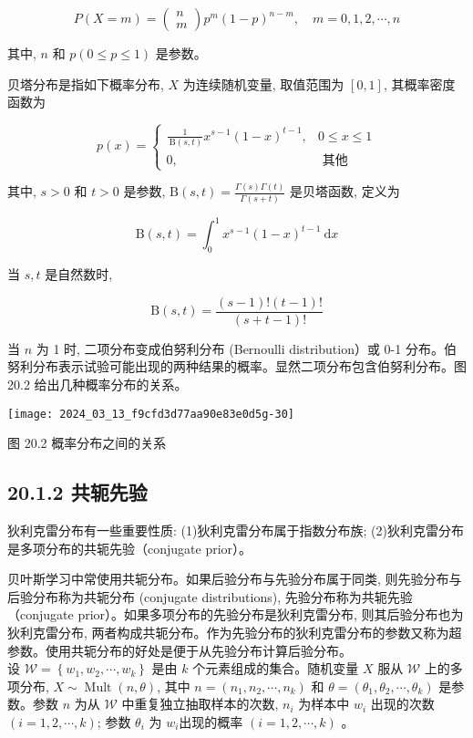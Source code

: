 \documentclass[10pt]{article}
\begin{document}
\begin{CJK*}{UTF8}{bsmi}
\[
P(X=m)=\left(\begin{array}{c}
n  \tag{20.6}\\
m
\end{array}\right) p^{m}(1-p)^{n-m}, \quad m=0,1,2, \cdots, n
\]

其中, $n$ 和 $p(0 \leqslant p \leqslant 1)$ 是参数。

贝塔分布是指如下概率分布, $X$ 为连续随机变量, 取值范围为 $[0,1]$, 其概率密度函数为

\[
p(x)= \begin{cases}\frac{1}{\mathrm{~B}(s, t)} x^{s-1}(1-x)^{t-1}, & 0 \leqslant x \leqslant 1  \tag{20.7}\\ 0, & \text { 其他 }\end{cases}
\]

其中, $s>0$ 和 $t>0$ 是参数, $\mathrm{B}(s, t)=\frac{\Gamma(s) \Gamma(t)}{\Gamma(s+t)}$ 是贝塔函数, 定义为


\begin{equation*}
\mathrm{B}(s, t)=\int_{0}^{1} x^{s-1}(1-x)^{t-1} \mathrm{~d} x \tag{20.8}
\end{equation*}


当 $s, t$ 是自然数时,


\begin{equation*}
\mathrm{B}(s, t)=\frac{(s-1) !(t-1) !}{(s+t-1) !} \tag{20.9}
\end{equation*}


当 $n$ 为 1 时, 二项分布变成伯努利分布 (Bernoulli distribution）或 0-1 分布。伯努利分布表示试验可能出现的两种结果的概率。显然二项分布包含伯努利分布。图 20.2 给出几种概率分布的关系。

\begin{center}
\texttt{[image: 2024\_03\_13\_f9cfd3d77aa90e83e0d5g-30]}
\end{center}

图 20.2 概率分布之间的关系

\subsection*{20.1.2 共轭先验}
狄利克雷分布有一些重要性质: (1)狄利克雷分布属于指数分布族; (2)狄利克雷分布是多项分布的共轭先验（conjugate prior）。

贝叶斯学习中常使用共轭分布。如果后验分布与先验分布属于同类, 则先验分布与后验分布称为共轭分布 (conjugate distributions), 先验分布称为共轭先验（conjugate prior）。如果多项分布的先验分布是狄利克雷分布, 则其后验分布也为狄利克雷分布, 两者构成共轭分布。作为先验分布的狄利克雷分布的参数又称为超参数。使用共轭分布的好处是便于从先验分布计算后验分布。\\
设 $\mathcal{W}=\left\{w_{1}, w_{2}, \cdots, w_{k}\right\}$ 是由 $k$ 个元素组成的集合。随机变量 $X$ 服从 $\mathcal{W}$ 上的多项分布, $X \sim \operatorname{Mult}(n, \theta)$, 其中 $n=\left(n_{1}, n_{2}, \cdots, n_{k}\right)$ 和 $\theta=\left(\theta_{1}, \theta_{2}, \cdots, \theta_{k}\right)$ 是参数。参数 $n$ 为从 $\mathcal{W}$ 中重复独立抽取样本的次数, $n_{i}$ 为样本中 $w_{i}$ 出现的次数 $(i=1,2, \cdots, k)$; 参数 $\theta_{i}$ 为 $w_{i}$出现的概率 $(i=1,2, \cdots, k)$ 。


\end{CJK*}
\end{document}
